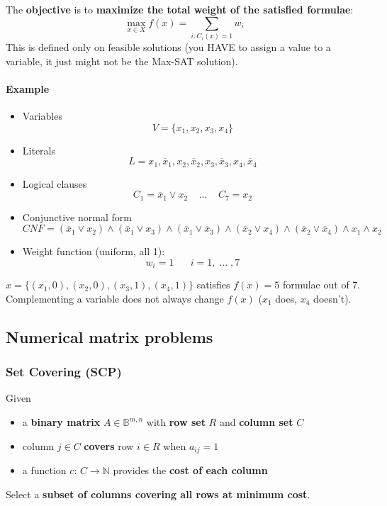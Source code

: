 The \textbf{objective} is to \textbf{maximize the total weight of the satisfied formulae}: 
$$ \max_{x \in X} f(x) = \sum_{i:C_i(x) = 1} w_i $$
This is defined only on feasible solutions (you HAVE to assign a value to a variable, it just might not be the Max-SAT solution).\\

\paragraph{Example}
\begin{itemize}
	\item Variables
	$$ V = \{x_1, x_2, x_3, x_4\} $$
	\item Literals
	$$ L = {x_1, \overline{x}_1, x_2, \overline{x}_2, x_3, \overline{x}_3, x_4, \overline{x}_4} $$
	\item Logical clauses
	$$ C_1 = \overline{x}_1 \vee x_2 \;\;\;\; ... \;\;\;\; C_7 = x_2 $$ 
	\item Conjunctive normal form
	$$CNF = (\overline{x}_1 \vee x_2) \wedge (\overline{x}_1 \vee x_3) \wedge (\overline{x}_1 \vee \overline{x}_3) \wedge (\overline{x}_2 \vee x_4) \wedge (\overline{x}_2 \vee \overline{x}_4) \wedge x_1 \wedge x_2 $$
	\item Weight function (uniform, all 1):
	$$ w_i = 1 \;\;\;\;\;\; i = 1, \; ... \; ,7 $$
\end{itemize}
$x = \{(x_1, 0), (x_2, 0), (x_3, 1), (x_4, 1)\}$ satisfies $f (x) = 5$ formulae out of $7$.\\
Complementing a variable does not always change $f(x)$ ($x_1$ does, $x_4$ doesn't).\\

\newpage

\subsection{Numerical matrix problems}
\subsubsection{Set Covering (SCP)}
Given
\begin{itemize}
	\item a \textbf{binary matrix} $A \in \mathbb{B}^{m,n}$ with \textbf{row set} $R$ and \textbf{column set} $C$
	\item column $j \in C$ \textbf{covers} row $i \in R$ when $a_{ij} = 1$
	\item a function $c :\, C \rightarrow \mathbb{N}$ provides the \textbf{cost of each column}
\end{itemize}
Select a \textbf{subset of columns covering all rows at minimum cost}.\\

